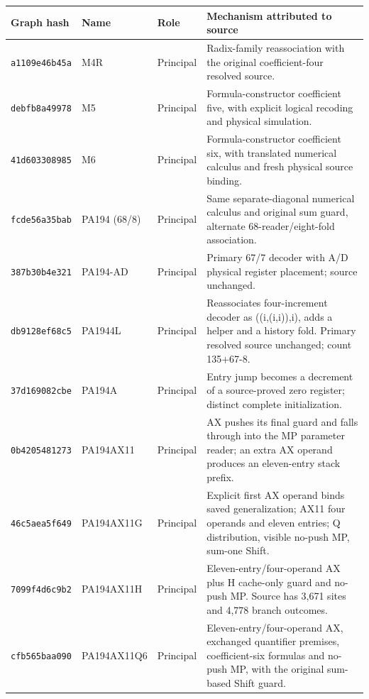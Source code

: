 {\footnotesize\setlength{\tabcolsep}{4pt}
\begin{longtable}{@{}>{\raggedright\arraybackslash}p{}>{\raggedright\arraybackslash}p{}>{\raggedright\arraybackslash}p{}>{\raggedright\arraybackslash}p{}@{}}
\toprule Graph hash&Name&Role&Mechanism attributed to source\\\midrule\endhead
\texttt{a1109e46b45a} & M4R & Principal & Radix-family reassociation with the original coefficient-four resolved source.\\[3pt]
\texttt{debfb8a49978} & M5 & Principal & Formula-constructor coefficient five, with explicit logical recoding and physical simulation.\\[3pt]
\texttt{41d603308985} & M6 & Principal & Formula-constructor coefficient six, with translated numerical calculus and fresh physical source binding.\\[3pt]
\texttt{fcde56a35bab} & PA194 (68/8) & Principal & Same separate-diagonal numerical calculus and original sum guard, alternate 68-reader/eight-fold association.\\[3pt]
\texttt{387b30b4e321} & PA194-AD & Principal & Primary 67/7 decoder with A/D physical register placement; source unchanged.\\[3pt]
\texttt{db9128ef68c5} & PA1944L & Principal & Reassociates four-increment decoder as ((i,(i,i)),i), adds a helper and a history fold. Primary resolved source unchanged; count 135+67-8.\\[3pt]
\texttt{37d169082cbe} & PA194A & Principal & Entry jump becomes a decrement of a source-proved zero register; distinct complete initialization.\\[3pt]
\texttt{0b4205481273} & PA194AX11 & Principal & AX pushes its final guard and falls through into the MP parameter reader; an extra AX operand produces an eleven-entry stack prefix.\\[3pt]
\texttt{46c5aea5f649} & PA194AX11G & Principal & Explicit first AX operand binds saved generalization; AX11 four operands and eleven entries; Q distribution, visible no-push MP, sum-one Shift.\\[3pt]
\texttt{7099f4d6c9b2} & PA194AX11H & Principal & Eleven-entry/four-operand AX plus H cache-only guard and no-push MP. Source has 3,671 sites and 4,778 branch outcomes.\\[3pt]
\texttt{cfb565baa090} & PA194AX11Q6 & Principal & Eleven-entry/four-operand AX, exchanged quantifier premises, coefficient-six formulas and no-push MP, with the original sum-based Shift guard.\\[3pt]

\end{longtable}}
